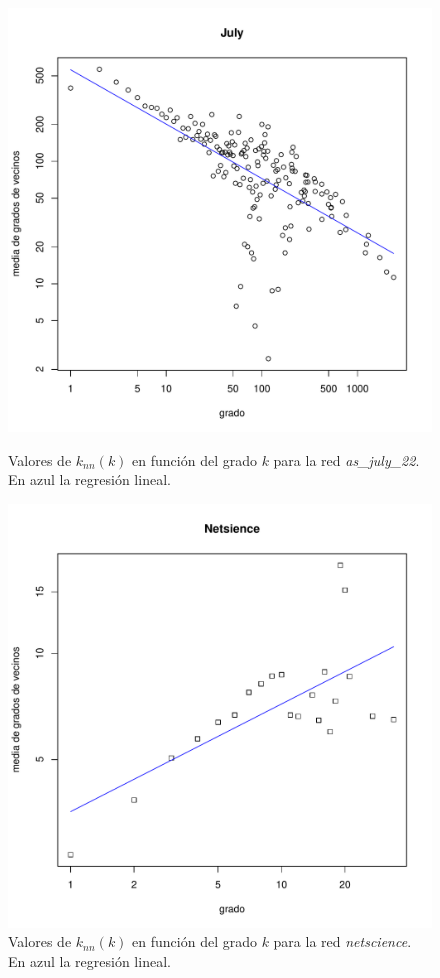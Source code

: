 \documentclass{article}
\begin{document}
\begin{figure}[!htb]
\centering
   \begin{minipage}{0.4\textwidth}
	\centering
	\includegraphics[width=1.0\linewidth]{Imagenes_P4/ej42}
	\caption{Valores de $k_{nn}(k)$ en función del grado $k$ para la red \textit{as\_july\_22}. En azul la regresión lineal.}
	\label{pt4july}
   \end{minipage}
   \hspace{50px}
   \begin{minipage}{0.4\textwidth}
	\centering
	\includegraphics[width=1.0\linewidth]{Imagenes_P4/ej44}
	\caption{Valores de $k_{nn}(k)$ en función del grado $k$ para la red \textit{netscience}. En azul la regresión lineal.}
	\label{pt4netscience}
   \end{minipage}
\end{figure}
\end{document}
